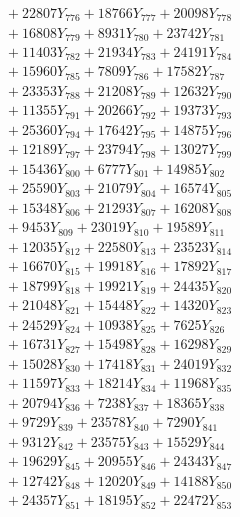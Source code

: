 \documentclass[a4paper,10pt]{article}
\begin{document}
{\begin{align}
&\;  + 22807 Y_{776} + 18766 Y_{777} + 20098 Y_{778} \\[0.5ex]\allowbreak
&\;  + 16808 Y_{779} + 8931 Y_{780} + 23742 Y_{781} \\[0.3ex]
&\;  + 11403 Y_{782} + 21934 Y_{783} + 24191 Y_{784} \\[0.3ex]
&\;  + 15960 Y_{785} + 7809 Y_{786} + 17582 Y_{787} \\[0.3ex]
&\;  + 23353 Y_{788} + 21208 Y_{789} + 12632 Y_{790} \\[0.3ex]
&\;  + 11355 Y_{791} + 20266 Y_{792} + 19373 Y_{793} \\[0.3ex]
&\;  + 25360 Y_{794} + 17642 Y_{795} + 14875 Y_{796} \\[0.3ex]
&\;  + 12189 Y_{797} + 23794 Y_{798} + 13027 Y_{799} \\[0.3ex]
&\;  + 15436 Y_{800} + 6777 Y_{801} + 14985 Y_{802} \\[0.3ex]
&\;  + 25590 Y_{803} + 21079 Y_{804} + 16574 Y_{805} \\[0.3ex]
&\;  + 15348 Y_{806} + 21293 Y_{807} + 16208 Y_{808} \\[0.5ex]\allowbreak
&\;  + 9453 Y_{809} + 23019 Y_{810} + 19589 Y_{811} \\[0.3ex]
&\;  + 12035 Y_{812} + 22580 Y_{813} + 23523 Y_{814} \\[0.3ex]
&\;  + 16670 Y_{815} + 19918 Y_{816} + 17892 Y_{817} \\[0.3ex]
&\;  + 18799 Y_{818} + 19921 Y_{819} + 24435 Y_{820} \\[0.3ex]
&\;  + 21048 Y_{821} + 15448 Y_{822} + 14320 Y_{823} \\[0.3ex]
&\;  + 24529 Y_{824} + 10938 Y_{825} + 7625 Y_{826} \\[0.3ex]
&\;  + 16731 Y_{827} + 15498 Y_{828} + 16298 Y_{829} \\[0.3ex]
&\;  + 15028 Y_{830} + 17418 Y_{831} + 24019 Y_{832} \\[0.3ex]
&\;  + 11597 Y_{833} + 18214 Y_{834} + 11968 Y_{835} \\[0.3ex]
&\;  + 20794 Y_{836} + 7238 Y_{837} + 18365 Y_{838} \\[0.5ex]\allowbreak
&\;  + 9729 Y_{839} + 23578 Y_{840} + 7290 Y_{841} \\[0.3ex]
&\;  + 9312 Y_{842} + 23575 Y_{843} + 15529 Y_{844} \\[0.3ex]
&\;  + 19629 Y_{845} + 20955 Y_{846} + 24343 Y_{847} \\[0.3ex]
&\;  + 12742 Y_{848} + 12020 Y_{849} + 14188 Y_{850} \\[0.3ex]
&\;  + 24357 Y_{851} + 18195 Y_{852} + 22472 Y_{853} \\[0.3ex]

\end{align}}
\end{document}
